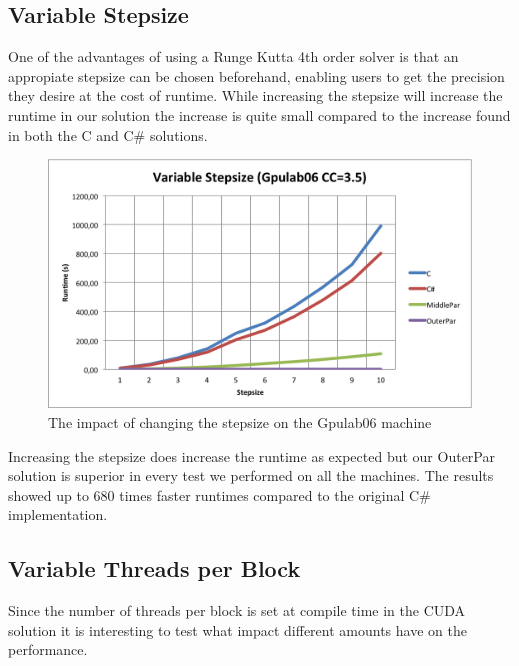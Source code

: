 \subsection{Variable Stepsize}
One of the advantages of using a Runge Kutta 4th order solver is that an appropiate stepsize can be chosen beforehand, enabling users to get the precision they desire at the cost of runtime. While increasing the stepsize will increase the runtime in our solution the increase is quite small compared to the increase found in both the C and C\# solutions.

\begin{figure}
\begin{center}
	\includegraphics[width=\textwidth]{img/Gpulab-stepsize.png}
\end{center}
\caption{The impact of changing the stepsize on the Gpulab06 machine}
\end{figure}

Increasing the stepsize does increase the runtime as expected but our OuterPar solution is superior in every test we performed on all the machines. The results showed up to 680 times faster runtimes compared to the original C\# implementation.

\subsection{Variable Threads per Block}
Since the number of threads per block is set at compile time in the CUDA solution it is interesting to test what impact different amounts have on the performance.

